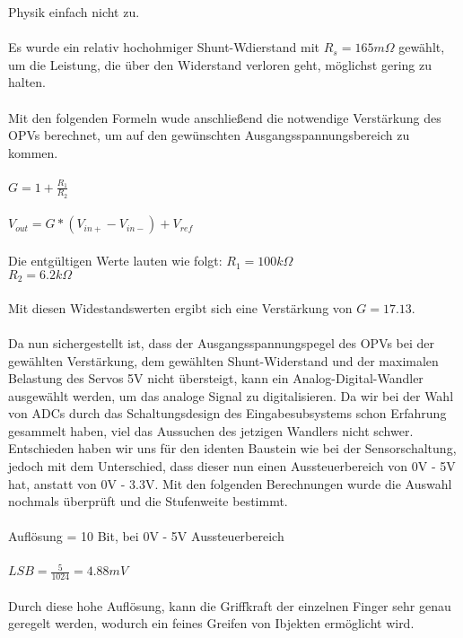 \documentclass[titlepage,12pt,twoside]{article}
\begin{document}
Physik einfach nicht zu. \\
\\
Es wurde ein relativ hochohmiger Shunt-Wdierstand mit $R_{s} = 165m\Omega$ gewählt, um die Leistung, die über den Widerstand verloren geht, möglichst gering zu halten. \\
\\
Mit den folgenden Formeln wude anschließend die notwendige Verstärkung des OPVs berechnet, um auf den gewünschten Ausgangsspannungsbereich zu kommen. \\
\\
$G = 1+\frac{R_{1}}{R_{2}}$ \\
\\
$V_{out} = G*(V_{in+}-V_{in-})+V_{ref}$ \\
\\
Die entgültigen Werte lauten wie folgt: $R_{1} = 100k\Omega$ \\
\hspace*{7.03cm}						$R_{2} = 6.2k\Omega$ \\
\\
Mit diesen Widestandswerten ergibt sich eine Verstärkung von $G = 17.13$. \\
\\
Da nun sichergestellt ist, dass der Ausgangsspannungspegel des OPVs bei der gewählten Verstärkung, dem gewählten Shunt-Widerstand und der 
maximalen Belastung des Servos 5V nicht übersteigt, kann ein Analog-Digital-Wandler ausgewählt werden, um das analoge Signal zu
digitalisieren. Da wir bei der Wahl von ADCs durch das Schaltungsdesign des Eingabesubsystems schon Erfahrung gesammelt haben, viel
das Aussuchen des jetzigen Wandlers nicht schwer. Entschieden haben wir uns für den identen Baustein wie bei der Sensorschaltung, 
jedoch mit dem Unterschied, dass dieser nun einen Aussteuerbereich von 0V - 5V hat, anstatt von 0V - 3.3V. Mit den folgenden Berechnungen
wurde die Auswahl nochmals überprüft und die Stufenweite bestimmt. \\
\\
Auflösung = 10 Bit, bei 0V - 5V Aussteuerbereich\\
\\
$LSB = \frac{5}{1024} = 4.88mV$ \\
\\
Durch diese hohe Auflösung, kann die Griffkraft der einzelnen Finger sehr genau geregelt werden, wodurch ein feines Greifen von Ibjekten
ermöglicht wird. \\
\\
\end{document}
